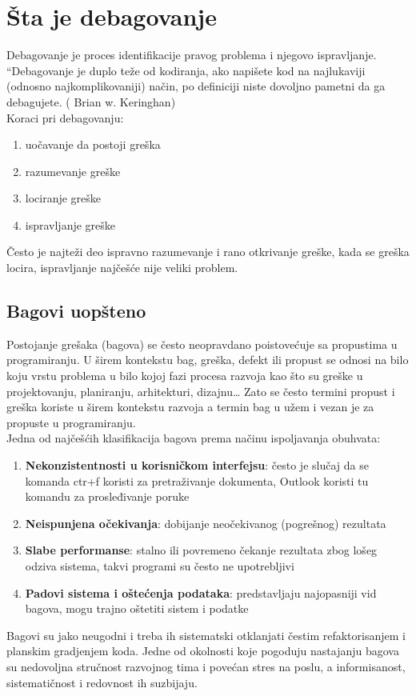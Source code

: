 \documentclass[a4paper]{article}
\begin{document}
\section{Šta je debagovanje}
\label{sec:sta je debagovanje}

Debagovanje je proces identifikacije pravog problema i njegovo ispravljanje.
“Debagovanje je duplo teže od kodiranja, ako napišete kod na najlukaviji (odnosno najkomplikovaniji) način, po definiciji niste dovoljno pametni da ga debagujete. ( Brian w. Keringhan) \cite{debagovanje_vladaf}\\
Koraci pri debagovanju\cite{bagovi_smalkov}:
\begin{enumerate}
\item uočavanje da postoji greška
\item razumevanje greške
\item lociranje greške
\item ispravljanje greške
\end{enumerate}
Često je najteži deo ispravno razumevanje i rano otkrivanje greške, kada se greška locira, ispravljanje najčešće nije veliki problem.


\subsection{Bagovi uopšteno}
\label{subsec:podnaslov1}

Postojanje grešaka (bagova) se često neopravdano poistovećuje sa propustima u programiranju.
U širem kontekstu bag, greška, defekt ili propust se odnosi na bilo koju vrstu problema u bilo kojoj fazi procesa razvoja kao što su greške u projektovanju, planiranju, arhitekturi, dizajnu…
Zato se često termini propust i greška koriste u širem kontekstu razvoja a termin bag u užem i vezan je za propuste u programiranju.\\
\indent Jedna od najčešćih klasifikacija bagova prema načinu ispoljavanja obuhvata:
\begin{enumerate}
	\item \textbf{Nekonzistentnosti u korisničkom interfejsu}: često je slučaj da se komanda ctr+f koristi za pretraživanje dokumenta, Outlook koristi   
	tu komandu za prosleđivanje poruke
	\item \textbf{Neispunjena očekivanja}: dobijanje neočekivanog (pogrešnog) rezultata
	\item \textbf{Slabe performanse}: stalno ili povremeno čekanje rezultata zbog lošeg odziva sistema, takvi programi su često ne upotrebljivi
	\item \textbf{Padovi sistema i oštećenja podataka}: predstavljaju najopasniji vid bagova, mogu trajno oštetiti sistem i podatke
\end{enumerate}
\indent Bagovi su jako neugodni i treba ih sistematski otklanjati čestim refaktorisanjem i planskim gradjenjem koda. Jedne od okolnosti koje pogoduju nastajanju bagova su nedovoljna stručnost razvojnog tima i povećan stres na poslu, a informisanost, sistematičnost i redovnost ih suzbijaju. \cite{bagovi_smalkov}
\end{document}
